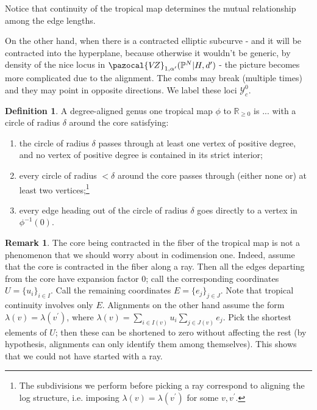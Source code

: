 \documentclass[11pt]{amsart}
\newcommand{\PP}{\mathbb P}
\newcommand{\VZ}{\pazocal{V\!Z}}
\theoremstyle{definition}
\theoremstyle{definition}
\newtheorem{dfn}[thm]{Definition}
\newtheorem{remark}[thm]{Remark}
\begin{document}
Notice that continuity of the tropical map determines the mutual relationship among the edge lengths.

On the other hand, when there is a contracted elliptic subcurve - and it will be contracted into the hyperplane, because otherwise it wouldn't be generic, by density of the nice locus in $\VZ_{1,\alpha^\prime}(\PP^N|H,d^\prime)$ - the picture becomes more complicated due to the alignment. The combs may break (multiple times) and they may point in opposite directions. We label these loci $\mathcal{Y}_c^0$.
\begin{figure}
\end{figure}
\begin{dfn}
 A degree-aligned genus one tropical map $\phi$ to $\mathbb R_{\geq 0}$ is ... with a circle of radius $\delta$ around the core satisfying:
 \begin{enumerate}
  \item the circle of radius $\delta$ passes through at least one vertex of positive degree, and no vertex of positive degree is contained in its strict interior;
  \item every circle of radius $<\delta$ around the core passes through (either none or) at least two vertices;\footnote{The subdivisions we perform before picking a ray correspond to aligning the log structure, i.e. imposing $\lambda(v)=\lambda(v^\prime)$ for some $v,v^\prime$.}
  \item every edge heading out of the circle of radius $\delta$ goes directly to a vertex in $\phi^{-1}(0)$.
 \end{enumerate}
\end{dfn}

\begin{remark}
 The core being contracted in the fiber of the tropical map is not a phenomenon that we should worry about in codimension one. Indeed, assume that the core is contracted in the fiber along a ray. Then all the edges departing from the core have expansion factor $0$; call the corresponding coordinates $U=\{u_i\}_{i\in I}$. Call the remaining coordinates $E=\{e_j\}_{j\in J}$. Note that tropical continuity involves only $E$. Alignments on the other hand assume the form $\lambda(v)=\lambda(v^\prime)$, where $\lambda(v)=\sum_{i\in I(v)}u_i\sum_{j\in J(v)}e_j$. Pick the shortest elements of $U$; then these can be shortened to zero without affecting the rest (by hypothesis, alignments can only identify them among themselves). This shows that we could not have started with a ray.
\end{remark}
\end{document}
